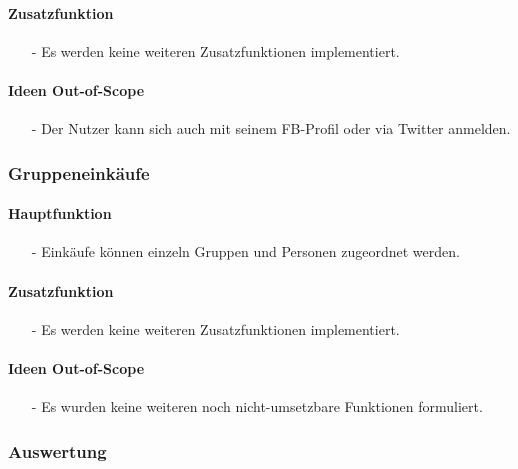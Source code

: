 \documentclass[12pt,a4paper]{article}
\begin{document}
\paragraph{Zusatzfunktion}
\begin{itemize}
\item[-]Es werden keine weiteren Zusatzfunktionen implementiert.
\end{itemize}
\paragraph{Ideen Out-of-Scope}
\begin{itemize}
\item[-]Der Nutzer kann sich auch mit seinem FB-Profil oder via Twitter anmelden.
\end{itemize}
\subsubsection{Gruppeneinkäufe}
\paragraph{Hauptfunktion}
\begin{itemize}
\item[-]Einkäufe können einzeln Gruppen und Personen zugeordnet werden.
\end{itemize}
\paragraph{Zusatzfunktion}
\begin{itemize}
\item[-]Es werden keine weiteren Zusatzfunktionen implementiert.
\end{itemize}
\paragraph{Ideen Out-of-Scope}
\begin{itemize}
\item[-]Es wurden keine weiteren noch nicht-umsetzbare Funktionen formuliert.
\end{itemize}
\subsubsection{Auswertung}
\end{document}
